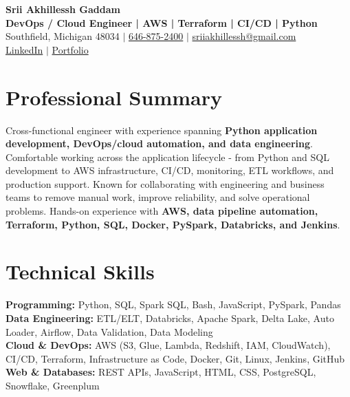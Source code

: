 \documentclass[letterpaper,10pt]{article}
\begin{document}
\fontsize{9.35pt}{10.45pt}\selectfont

\begin{center}
    {\LARGE \textbf{Srii Akhillessh Gaddam}} \\[-1pt]
    \textbf{DevOps / Cloud Engineer | AWS | Terraform | CI/CD | Python} \\[2pt]
    Southfield, Michigan 48034 $|$
    \href{tel:6468752400}{646-875-2400} $|$
    \href{mailto:sriiakhillessh@gmail.com}{sriiakhillessh@gmail.com} \\[1pt]
    \href{https://www.linkedin.com/in/srii-akhiilessh-gaddam-b48668191/}{LinkedIn} $|$
    \href{https://sriiakhillesshg.github.io/portfolio/}{Portfolio}
\end{center}
\vspace{-8pt}

\section{Professional Summary}
\small{Cross-functional engineer with experience spanning \textbf{Python application development, DevOps/cloud automation, and data engineering}. Comfortable working across the application lifecycle - from Python and SQL development to AWS infrastructure, CI/CD, monitoring, ETL workflows, and production support. Known for collaborating with engineering and business teams to remove manual work, improve reliability, and solve operational problems. Hands-on experience with \textbf{AWS, data pipeline automation, Terraform, Python, SQL, Docker, PySpark, Databricks, and Jenkins}.}

\section{Technical Skills}
\small{
\textbf{Programming:} Python, SQL, Spark SQL, Bash, JavaScript, PySpark, Pandas \\
\textbf{Data Engineering:} ETL/ELT, Databricks, Apache Spark, Delta Lake, Auto Loader, Airflow, Data Validation, Data Modeling \\
\textbf{Cloud \& DevOps:} AWS (S3, Glue, Lambda, Redshift, IAM, CloudWatch), CI/CD, Terraform, Infrastructure as Code, Docker, Git, Linux, Jenkins, GitHub \\
\textbf{Web \& Databases:} REST APIs, JavaScript, HTML, CSS, PostgreSQL, Snowflake, Greenplum
}
\end{document}
